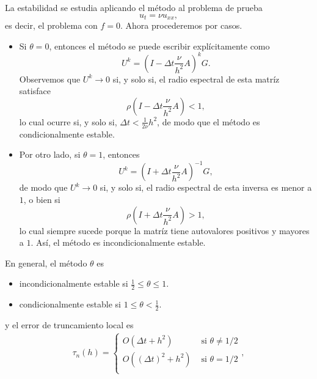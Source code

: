 \documentclass[11pt,letterpaper]{report}
\begin{document}
La estabilidad se estudia aplicando el método al problema de
prueba
\begin{equation}
  u_t = \nu u_{xx}
,\end{equation}
es decir, el problema con $f=0$.
Ahora procederemos por casos.
\begin{itemize}
  \item
    Si $\theta=0$, entonces el método se
    puede escribir explícitamente como
    \begin{equation}
      U^{k}
      =
        \left(
          I-
          \Delta t
          \frac{\nu}{h^{2}}A
        \right)^k
        G
    .\end{equation}
    Observemos que $U^{k}\to 0$ si, y solo si, el radio espectral de esta
    matríz satisface
    \begin{equation}
      \rho
        \left(
          I-
          \Delta t
          \frac{\nu}{h^{2}}A
        \right) < 1
    ,\end{equation}
    lo cual ocurre si, y solo si, $\Delta t < \frac{1}{2\nu}h^{2}$,
    de modo que el método es condicionalmente estable.

  \item
    Por otro lado, si $\theta =1$, entonces
    \begin{equation}
      U^{k}
      =
      \left( I
        +
        \Delta t
        \frac{\nu}{h^{2}}A
      \right)^{-1}
      G
    ,\end{equation}
    de modo que $U^{k}\to 0$ si, y solo si, el radio espectral de
    esta inversa es menor a $1$, o bien si
    \begin{equation}
      \rho
      \left( I
        +
        \Delta t
        \frac{\nu}{h^{2}}A
      \right)
      >1
    ,\end{equation}
    lo cual siempre sucede porque la matríz tiene autovalores
    positivos y mayores a $1$. Así, el método es incondicionalmente
    estable.
\end{itemize}

En general, el método $\theta$ es
\begin{itemize}
  \item
    incondicionalmente estable si $\frac{1}{2}\leq \theta\leq 1$.
  \item
    condicionalmente estable si $1\leq\theta<\frac{1}{2}$.
\end{itemize}
y el error de truncamiento local es
\begin{align}
  \tau_n(h)
  =
  \begin{cases}
    O(\Delta t + h^{2}) & \text{ si } \theta \neq 1 / 2 \\
    O((\Delta t)^{2} + h^{2}) & \text{ si } \theta = 1 / 2 \\
  \end{cases}
,\end{align}
\end{document}
